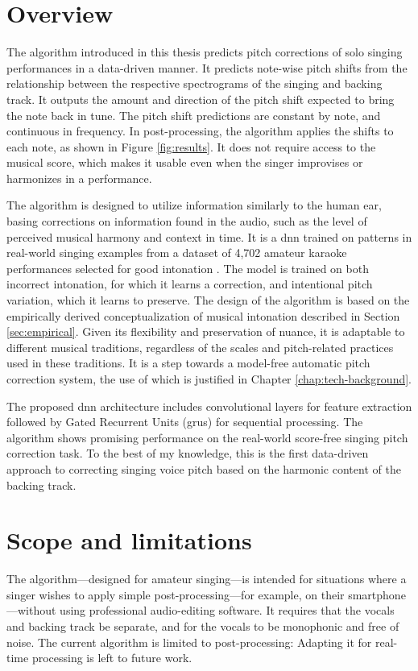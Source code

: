 \section{Overview}
The algorithm introduced in this thesis predicts pitch corrections of solo singing performances in a data-driven manner. It predicts note-wise pitch shifts from the relationship between the respective spectrograms of the singing and backing track. It outputs the amount and direction of the pitch shift expected to bring the note back in tune. The pitch shift predictions are constant by note, and continuous in frequency. In post-processing, the algorithm applies the shifts to each note, as shown in Figure \ref{fig:results}. It does not require access to the musical score, which makes it usable even when the singer improvises or harmonizes in a performance.

The algorithm is designed to utilize information similarly to the human ear, basing corrections on information found in the audio, such as the level of perceived musical harmony and context in time. It is a \gls{dnn} trained on patterns in real-world singing examples from a dataset of 4,702 amateur karaoke performances selected for good intonation \cite{wager2018intonation}. The model is trained on both incorrect intonation, for which it learns a correction, and intentional pitch variation, which it learns to preserve. The design of the algorithm is based on the empirically derived conceptualization of musical intonation described in Section \ref{sec:empirical}. Given its flexibility and preservation of nuance, it is adaptable to different musical traditions, regardless of the scales and pitch-related practices used in these traditions. It is a step towards a model-free automatic pitch correction system, the use of which is justified in Chapter \ref{chap:tech-background}. 

The proposed \gls{dnn} architecture includes convolutional layers for feature extraction followed by Gated Recurrent Units (\gls{gru}s) for sequential processing. The algorithm shows promising performance on the real-world score-free singing pitch correction task. To the best of my knowledge, this is the first data-driven approach to correcting singing voice pitch based on the harmonic content of the backing track.

\section{Scope and limitations}
The algorithm---designed for amateur singing---is intended for situations where a singer wishes to apply simple post-processing---for example, on their smartphone---without using professional audio-editing software. It requires that the vocals and backing track be separate, and for the vocals to be monophonic and free of noise. The current algorithm is limited to post-processing: Adapting it for real-time processing is left to future work.

